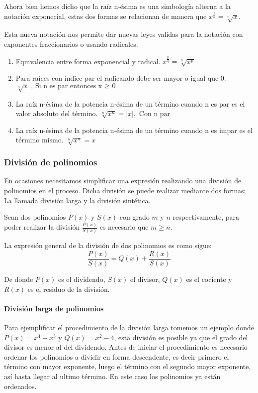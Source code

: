 \documentclass[11pt,letterpaper,oneside]{book}
\numberwithin{equation}{section}
\begin{document}
	\par Ahora bien hemos dicho que la raíz n-ésima es una simbología alterna a la notación exponecial, estas dos formas se relacionan de manera que  $x^{\frac{1}{n}} = \sqrt[n]{x}$.
	\par Esta nueva notación nos permite dar nuevas leyes validas para la notación con exponentes fraccionarios o usando radicales.
	
	\begin{enumerate}[resume*=LE]
		\item Equivalencia entre forma exponencial y radical. $x^{\frac{p}{q}} = \sqrt[q]{x^p}$
		\item Para raíces con índice par el radicando debe ser mayor o igual que 0. $\sqrt[n]{x} \text{, Si n es par entonces x $\geq$ 0} $
		\item La raíz n-ésima de la potencia n-ésima de un término cuando n es par es el valor absoluto del término. $\sqrt[n]{x^n} = |x|, \text{ Con n par}$
		\item La raíz n-ésima de la potencia n-ésima de un término cuando n es impar es el término mismo. $\sqrt[n]{x^n} = x$
	\end{enumerate}		
	
	\subsubsection{División de polinomios}
	
	\par En ocasiones necesitamos simplificar una expresión realizando una división de polinomios en el proceso. Dicha división se puede realizar mediante dos formas; La llamada división larga y la división sintética.
	
	\par Sean dos polinomios $P(x)$ y $S(x)$ con grado $m$ y $n$ respectivamente, para poder realizar la división $\frac{P(x)}{S(x)}$ es necesario que $m \geq n$.
	
	\par La expresión general de la división de dos polinomios es como sigue:
	\begin{equation}
	\frac{P(x)}{S(x)} = Q(x) + \frac{R(x)}{S(x)} \label{divp}
	\end{equation}
	
	\par De donde $P(x)$ es el dividendo, $S(x)$ el divisor, $Q(x)$ es el cociente y $R(x)$ es el residuo de la división.
	
	
	\paragraph{División larga de polinomios} Para ejemplificar el procedimiento de la división larga tomemos un ejemplo donde $P(x)=x^4+x^3$ y $Q(x)=x^2-4$, esta división es posible ya que el grado del divisor es menor al del dividendo. Antes de iniciar el procedimiento es necesario ordenar los polinomios a dividir en forma descendente, es decir primero el término con mayor exponente, luego el término con el segundo mayor exponente, así hasta llegar al ultimo término. En este caso los polinomios ya están ordenados.
	
\end{document}
